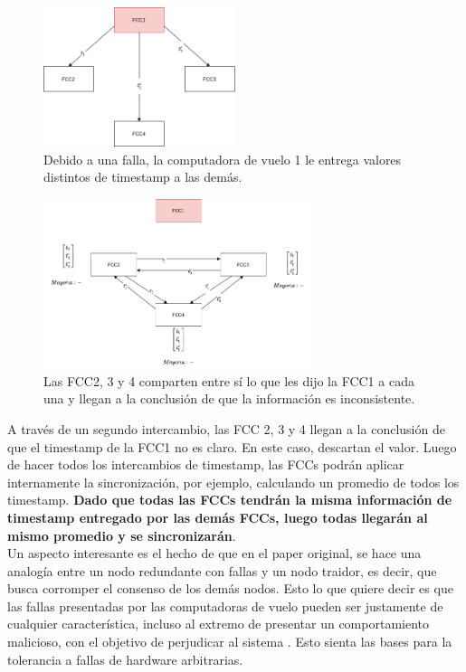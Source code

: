\begin{figure}[H]
    \centering
    \includegraphics[width=0.5\textwidth]{img/Byzantine_Generals_Problem_5.png}
    \caption{Debido a una falla, la computadora de vuelo 1 le entrega valores distintos de timestamp a las demás.}
    \label{fig:Byzantine_Generals_Problem_5}
\end{figure}

\begin{figure}[H]
    \centering
    \includegraphics[width=0.7\textwidth]{img/Byzantine_Generals_Problem_6.png}
    \caption{Las FCC2, 3 y 4 comparten entre sí lo que les dijo la FCC1 a cada una y llegan a la conclusión de que la información es inconsistente.}
    \label{fig:Byzantine_Generals_Problem_6}
\end{figure}

A través de un segundo intercambio, las FCC 2, 3 y 4 llegan a la conclusión de que el timestamp de la FCC1 no es claro. En este caso, descartan el valor. Luego de hacer todos los intercambios de timestamp, las FCCs podrán aplicar internamente la sincronización, por ejemplo, calculando un promedio de todos los timestamp. \textbf{Dado que todas las FCCs tendrán la misma información de timestamp entregado por las demás FCCs, luego todas llegarán al mismo promedio y se sincronizarán}.\\

Un aspecto interesante es el hecho de que en el paper original, se hace una analogía entre un nodo redundante con fallas y un nodo traidor, es decir, que busca corromper el consenso de los demás nodos. Esto lo que quiere decir es que las fallas presentadas por las computadoras de vuelo pueden ser justamente de cualquier característica, incluso al extremo de presentar un comportamiento malicioso, con el objetivo de perjudicar al sistema \cite{lala1994architectural}. Esto sienta las bases para la tolerancia a fallas de hardware arbitrarias.\\

